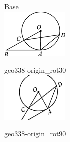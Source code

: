 \documentclass[12pt]{article}
\begin{document}
\begin{center}
\begin{minipage}{0.32\textwidth}\centering
Base\\
\includegraphics[width=0.95\linewidth]{out_rommath_origin/items/geo338-origin/assets/figure.png}
\end{minipage}
\hfill\begin{minipage}{0.32\textwidth}\centering
geo338-origin\_rot30\\
\includegraphics[width=0.95\linewidth]{out_rommath_origin/items/geo338-origin/assets/figure_rot30.png}
\end{minipage}
\hfill\begin{minipage}{0.32\textwidth}\centering
geo338-origin\_rot90\\

\end{minipage}
\end{center}
\end{document}
